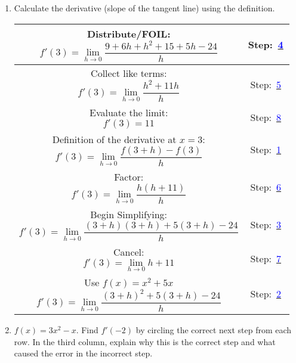 \documentclass[letterpaper,11pt]{article}
\newcommand{\tsol}[1]{\textcolor{blue}{#1}}
\newcommand{\tsol}[1]{\textcolor{white}{#1}}
\newcommand{\lcell}[1]{
\begin{minipage}[c][1 in]{4.5 in}
#1
\end{minipage}}
\newcommand{\rcell}[1]{
\begin{minipage}[c][1 in]{1 in}
Step: \underline{\Huge$\,$\tsol{#1}$\,$}
\end{minipage}}
\begin{document}
\begin{enumerate}

\item Calculate the derivative (slope of the tangent line) using the definition.

\vspace{.2 in}

\begin{tabular}{| c | c |} \hline
\lcell{Distribute/FOIL: \[f'(3)=\lim_{h \rightarrow 0} \frac{9+6h+h^2+15+5h-24}{h} \]} & \rcell{4} \\ \hline
\lcell{Collect like terms: \[f'(3)=\lim_{h \rightarrow 0} \frac{h^2+11h}{h} \]} & \rcell{5} \\ \hline
\lcell{Evaluate the limit: \[f'(3)=11\]}  & \rcell{8} \\ \hline
\lcell{Definition of the derivative at $x=3$: \[f'(3)=\lim_{h \rightarrow 0} \frac{f(3+h)-f(3)}{h}\]} & \rcell{1} \\ \hline
\lcell{Factor: \[f'(3)=\lim_{h \rightarrow 0} \frac{h(h+11)}{h} \] } & \rcell{6} \\ \hline
\lcell{Begin Simplifying: \[f'(3)=\lim_{h \rightarrow 0} \frac{(3+h)(3+h)+5(3+h)-24}{h} \]} & \rcell{3} \\ \hline
\lcell{Cancel: \[f'(3)=\lim_{h \rightarrow 0} h+11\]} & \rcell{7} \\ \hline
\lcell{Use $f(x)=x^2+5x$ \[f'(3)=\lim_{h \rightarrow 0} \frac{(3+h)^2+5(3+h)-24}{h} \]} & \rcell{2} \\ \hline
\end{tabular}

\newpage

\item $f(x)=3x^2-x$. Find $f'(-2)$ by circling the correct next step from each row. In the third column, explain why this is the correct step and what caused the error in the incorrect step.


\end{enumerate}
\end{document}
